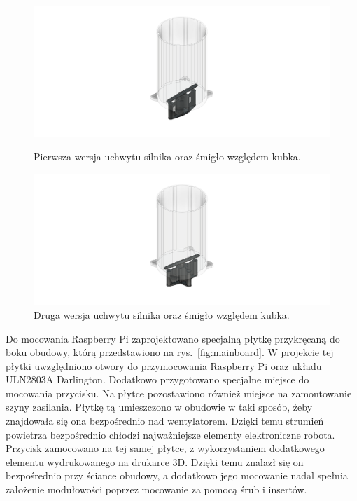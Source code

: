 \begin{figure}[H]
    \centering
    \begin{minipage}{0.48\textwidth}
        \centering
        \includegraphics[width=\linewidth]{chapters/03-praca-wlasna/figures/uchwyt_v1}
        \caption{\label{fig:uchwyt_v1}Pierwsza wersja uchwytu silnika oraz śmigło względem kubka.}
    \end{minipage}
    \hfill
    \begin{minipage}{0.48\textwidth}
        \centering
        \includegraphics[width=\linewidth]{chapters/03-praca-wlasna/figures/uchwyt_v2}
        \caption{\label{fig:uchwyt_v2}Druga wersja uchwytu silnika oraz śmigło względem kubka.}
    \end{minipage}
\end{figure}


Do mocowania Raspberry Pi zaprojektowano specjalną płytkę przykręcaną do boku obudowy, którą przedstawiono na rys.~\ref{fig:mainboard}. W projekcie tej płytki uwzględniono otwory do przymocowania Raspberry
Pi oraz układu ULN2803A Darlington. Dodatkowo przygotowano specjalne miejsce do mocowania przycisku. Na płytce pozostawiono również miejsce
na zamontowanie szyny zasilania. Płytkę tą umieszczono w obudowie w taki sposób, żeby znajdowała się ona bezpośrednio nad wentylatorem. Dzięki temu
strumień powietrza bezpośrednio chłodzi najważniejsze elementy elektroniczne robota. Przycisk zamocowano na tej samej płytce, z wykorzystaniem
dodatkowego elementu wydrukowanego na drukarce 3D. Dzięki temu znalazł się on bezpośrednio przy ściance obudowy, a dodatkowo jego mocowanie
nadal spełnia założenie modułowości poprzez mocowanie za pomocą śrub i insertów.

